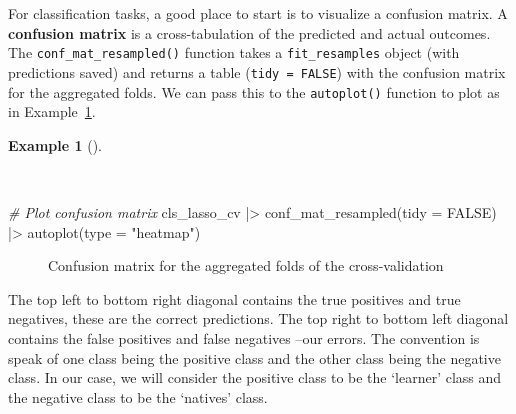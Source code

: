 \documentclass[
  letterpaper,
]{book}
\newenvironment{Shaded}{\begin{snugshade}}{\end{snugshade}}
\newcommand{\AttributeTok}[1]{\textcolor[rgb]{0.00,0.00,0.00}{#1}}
\newcommand{\CommentTok}[1]{\textcolor[rgb]{0.00,0.00,0.00}{\textit{#1}}}
\newcommand{\ConstantTok}[1]{\textcolor[rgb]{0.00,0.00,0.00}{#1}}
\newcommand{\FunctionTok}[1]{\textcolor[rgb]{0.00,0.00,0.00}{#1}}
\newcommand{\NormalTok}[1]{\textcolor[rgb]{0.00,0.00,0.00}{#1}}
\newcommand{\SpecialCharTok}[1]{\textcolor[rgb]{0.00,0.00,0.00}{#1}}
\newcommand{\StringTok}[1]{\textcolor[rgb]{0.00,0.00,0.00}{#1}}
\theoremstyle{definition}
\newtheorem{example}{Example}[chapter]
\theoremstyle{remark}
\begin{document}
For classification tasks, a good place to start is to visualize a
confusion matrix. A \textbf{confusion matrix} is a cross-tabulation of
the predicted and actual outcomes. The \texttt{conf\_mat\_resampled()}
function takes a \texttt{fit\_resamples} object (with predictions saved)
and returns a table (\texttt{tidy\ =\ FALSE}) with the confusion matrix
for the aggregated folds. We can pass this to the \texttt{autoplot()}
function to plot as in
Example~\ref{exm-predict-class-tune-hyperparameters-evaluate-workflow-cv-confusion}.

\begin{example}[]\protect\hypertarget{exm-predict-class-tune-hyperparameters-evaluate-workflow-cv-confusion}{}\label{exm-predict-class-tune-hyperparameters-evaluate-workflow-cv-confusion}

~

\begin{Shaded}
\begin{Highlighting}[]
\CommentTok{\# Plot confusion matrix}
\NormalTok{cls\_lasso\_cv }\SpecialCharTok{|\textgreater{}}
  \FunctionTok{conf\_mat\_resampled}\NormalTok{(}\AttributeTok{tidy =} \ConstantTok{FALSE}\NormalTok{) }\SpecialCharTok{|\textgreater{}}
  \FunctionTok{autoplot}\NormalTok{(}\AttributeTok{type =} \StringTok{"heatmap"}\NormalTok{)}
\end{Highlighting}
\end{Shaded}

\begin{figure}[!htb]


\caption{\label{fig-class-tune-hyperparameters-evaluate-workflow-cv-confusion}Confusion
matrix for the aggregated folds of the cross-validation}

\end{figure}%

\end{example}

The top left to bottom right diagonal contains the true positives and
true negatives, these are the correct predictions. The top right to
bottom left diagonal contains the false positives and false negatives
--our errors. The convention is speak of one class being the positive
class and the other class being the negative class. In our case, we will
consider the positive class to be the `learner' class and the negative
class to be the `natives' class.
\end{document}
